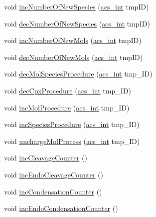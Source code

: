 \begin{DoxyCompactItemize}
\item 
void \hyperlink{classenvironment_a1055886a34a9a01ec37db31c69e460e0}{inc\-Number\-Of\-New\-Species} (\hyperlink{acs__headers_8h_a8d277355641a098190360234e2ebde35}{acs\-\_\-int} tmp\-I\-D)
\item 
void \hyperlink{classenvironment_a5fa52a4f8e73a71fa41d3a1641e50535}{dec\-Number\-Of\-New\-Species} (\hyperlink{acs__headers_8h_a8d277355641a098190360234e2ebde35}{acs\-\_\-int} tmp\-I\-D)
\item 
void \hyperlink{classenvironment_a1addb84f0c8d391f97ad2347a64208bb}{inc\-Number\-Of\-New\-Mols} (\hyperlink{acs__headers_8h_a8d277355641a098190360234e2ebde35}{acs\-\_\-int} tmp\-I\-D)
\item 
void \hyperlink{classenvironment_ae9bbd78076706050ced4dd7fb99036f1}{dec\-Number\-Of\-New\-Mols} (\hyperlink{acs__headers_8h_a8d277355641a098190360234e2ebde35}{acs\-\_\-int} tmp\-I\-D)
\item 
void \hyperlink{classenvironment_a10fad450cf5ef3a1c7cf75d616105069}{dec\-Mol\-Species\-Procedure} (\hyperlink{acs__headers_8h_a8d277355641a098190360234e2ebde35}{acs\-\_\-int} tmp\-\_\-\-I\-D)
\item 
void \hyperlink{classenvironment_a16d09f818d3012f88e8e4c9a7759b6bd}{dec\-Cpx\-Procedure} (\hyperlink{acs__headers_8h_a8d277355641a098190360234e2ebde35}{acs\-\_\-int} tmp\-\_\-\-I\-D)
\item 
void \hyperlink{classenvironment_a094499a0f1bb3c2342a3b16944f5280d}{inc\-Mol\-Procedure} (\hyperlink{acs__headers_8h_a8d277355641a098190360234e2ebde35}{acs\-\_\-int} tmp\-\_\-\-I\-D)
\item 
void \hyperlink{classenvironment_a7ac85445b4710257723c581c35cc5ac8}{inc\-Species\-Procedure} (\hyperlink{acs__headers_8h_a8d277355641a098190360234e2ebde35}{acs\-\_\-int} tmp\-\_\-\-I\-D)
\item 
void \hyperlink{classenvironment_af21c066ce18c8a39740f66a995782fb9}{uncharge\-Mol\-Process} (\hyperlink{acs__headers_8h_a8d277355641a098190360234e2ebde35}{acs\-\_\-int} tmp\-\_\-\-I\-D)
\item 
void \hyperlink{classenvironment_a480887ed06f63d34e014c19ea302d3d5}{inc\-Cleavage\-Counter} ()
\item 
void \hyperlink{classenvironment_ab0fc2cd6ed209d61286b837bd5460d90}{inc\-Endo\-Cleavage\-Counter} ()
\item 
void \hyperlink{classenvironment_a3fae8e57fad9ef5b182e32d9bb9989af}{inc\-Condensation\-Counter} ()
\item 
void \hyperlink{classenvironment_a01812d540519696ab07c9f822119cc64}{inc\-Endo\-Condensation\-Counter} ()

\end{DoxyCompactItemize}
